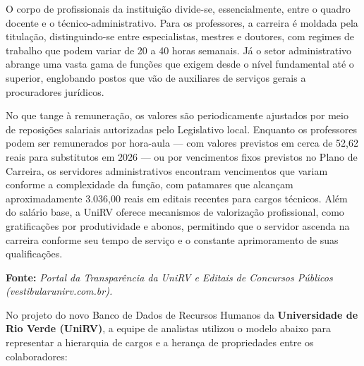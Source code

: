 \documentclass[12pt,a4paper]{article}
\begin{document}
\begin{enumerate}
O corpo de profissionais da institui{\c{c}}{\~a}o divide-se, essencialmente, entre o quadro docente e o t{\'e}cnico-administrativo. Para os professores, a carreira {\'e} moldada pela titula{\c{c}}{\~a}o, distinguindo-se entre especialistas, mestres e doutores, com regimes de trabalho que podem variar de 20 a 40 horas semanais. J{\'a} o setor administrativo abrange uma vasta gama de fun{\c{c}}{\~o}es que exigem desde o n{\'i}vel fundamental at{\'e} o superior, englobando postos que v{\~a}o de auxiliares de servi{\c{c}}os gerais a procuradores jur{\'i}dicos.

No que tange {\`a} remunera{\c{c}}{\~a}o, os valores s{\~a}o periodicamente ajustados por meio de reposi{\c{c}}{\~o}es salariais autorizadas pelo Legislativo local. Enquanto os professores podem ser remunerados por hora-aula --- com valores previstos em cerca de 52,62 reais para substitutos em 2026 --- ou por vencimentos fixos previstos no Plano de Carreira, os servidores administrativos encontram vencimentos que variam conforme a complexidade da fun{\c{c}}{\~a}o, com patamares que alcan{\c{c}}am aproximadamente 3.036,00 reais em editais recentes para cargos t{\'e}cnicos. Al{\'e}m do sal{\'a}rio base, a UniRV oferece mecanismos de valoriza{\c{c}}{\~a}o profissional, como gratifica{\c{c}}{\~o}es por produtividade e abonos, permitindo que o servidor ascenda na carreira conforme seu tempo de servi{\c{c}}o e o constante aprimoramento de suas qualifica{\c{c}}{\~o}es.


\noindent \textbf{Fonte:} \textit{Portal da Transpar{\^e}ncia da UniRV e Editais de Concursos P{\'u}blicos (vestibularunirv.com.br).}


No projeto do novo Banco de Dados de Recursos Humanos da \textbf{Universidade de Rio Verde (UniRV)}, a equipe de analistas utilizou o modelo abaixo para representar a hierarquia de cargos e a herança de propriedades entre os colaboradores:

\begin{center}
\end{center}
\end{enumerate}
\end{document}
